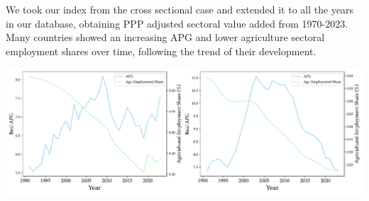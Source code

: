 \documentclass[landscape,a0paper, fontscale = 0.285]{baposter} %
\begin{document}
\begin{poster}
{\begin{minipage}[t]{0.35\textwidth}
We took our index from the cross sectional case and extended it to all the years
    in our database, obtaining PPP adjusted sectoral value added from 1970-2023.
    Many countries showed an increasing APG and lower agriculture sectoral employment
    shares over time, following the trend of their development. 
\end{minipage}%
\hfill
\begin{minipage}[t]{0.6\textwidth}
    \begin{center}
    \includegraphics[scale = 0.272]{time_series.pdf}
    \end{center}
\end{minipage}






}






\end{poster}
\end{document}
